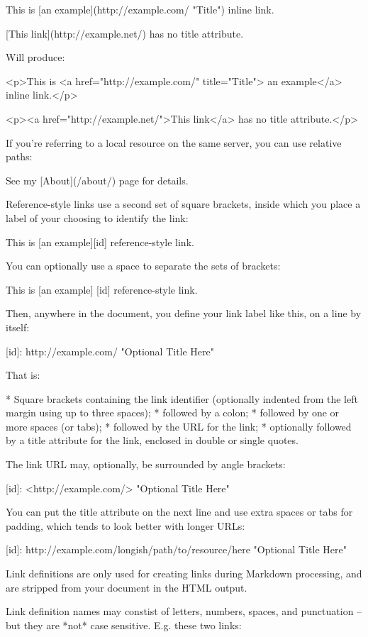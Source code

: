     This is [an example](http://example.com/ "Title") inline link.

    [This link](http://example.net/) has no title attribute.

Will produce:

    <p>This is <a href="http://example.com/" title="Title">
    an example</a> inline link.</p>

    <p><a href="http://example.net/">This link</a> has no
    title attribute.</p>

If you're referring to a local resource on the same server, you can
use relative paths:

    See my [About](/about/) page for details.

Reference-style links use a second set of square brackets, inside
which you place a label of your choosing to identify the link:

    This is [an example][id] reference-style link.

You can optionally use a space to separate the sets of brackets:

    This is [an example] [id] reference-style link.

Then, anywhere in the document, you define your link label like this,
on a line by itself:

    [id]: http://example.com/  "Optional Title Here"

That is:

*   Square brackets containing the link identifier (optionally
    indented from the left margin using up to three spaces);
*   followed by a colon;
*   followed by one or more spaces (or tabs);
*   followed by the URL for the link;
*   optionally followed by a title attribute for the link, enclosed
    in double or single quotes.

The link URL may, optionally, be surrounded by angle brackets:

    [id]: <http://example.com/>  "Optional Title Here"

You can put the title attribute on the next line and use extra spaces
or tabs for padding, which tends to look better with longer URLs:

    [id]: http://example.com/longish/path/to/resource/here
        "Optional Title Here"

Link definitions are only used for creating links during Markdown
processing, and are stripped from your document in the HTML output.

Link definition names may constist of letters, numbers, spaces, and punctuation -- but they are *not* case sensitive. E.g. these two links:

